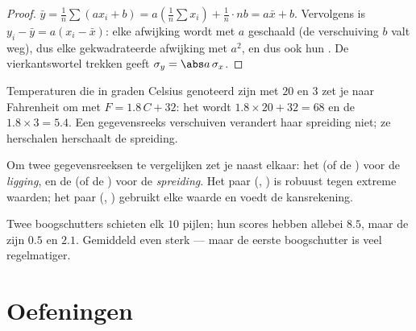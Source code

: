 \begin{proof}
$\bar y = \frac1n \sum (a x_i + b) = a\left(\frac1n\sum x_i\right) +
\frac1n \cdot nb = a\bar x + b$. Vervolgens is
$y_i - \bar y = a(x_i - \bar x)$: elke afwijking wordt met $a$ geschaald (de
verschuiving $b$ valt weg), dus elke gekwadrateerde afwijking met $a^2$, en
dus ook hun . De vierkantswortel trekken geeft
$\sigma_y = \abs a\,\sigma_x$.
\end{proof}

\begin{example}
Temperaturen die in graden Celsius genoteerd zijn met  $20$ en
 $3$ zet je naar Fahrenheit om met $F = 1.8\,C + 32$: het
 wordt $1.8 \times 20 + 32 = 68$ en de 
$1.8 \times 3 = 5.4$. Een gegevensreeks verschuiven verandert haar spreiding
niet; ze herschalen herschaalt de spreiding.
\end{example}

\begin{method}\label{met:g11:stat:compare}
Om twee gegevensreeksen te vergelijken zet je naast elkaar: het 
(of de ) voor de \emph{ligging}, en de  (of de
) voor de \emph{spreiding}. Het paar (,
) is robuust tegen extreme waarden; het paar (,
) gebruikt elke waarde en voedt de kansrekening.
\end{method}

\begin{example}
Twee boogschutters schieten elk $10$ pijlen; hun scores hebben allebei
 $8.5$, maar de  zijn $0.5$ en $2.1$. Gemiddeld
even sterk --- maar de eerste boogschutter is veel regelmatiger.
\end{example}

\section{Oefeningen}

